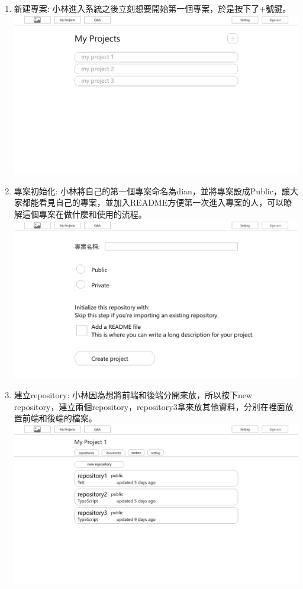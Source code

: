 \documentclass{report}
\begin{document}
\begin{enumerate}[label=(\Alph*)]
  \item 新建專案: 小林進入系統之後立刻想要開始第一個專案，於是按下了+號鍵。\\
  \includegraphics[width=\textwidth]{assets/wireframe/My_Projects.png}
  \item 專案初始化: 小林將自己的第一個專案命名為dian，並將專案設成Public，讓大家都能看見自己的專案，並加入README方便第一次進入專案的人，可以瞭解這個專案在做什麼和使用的流程。\\
  \includegraphics[width=\textwidth]{assets/wireframe/init_project.png}
  \item 建立repository: 小林因為想將前端和後端分開來放，所以按下new repository，建立兩個repository，repository3拿來放其他資料，分別在裡面放置前端和後端的檔案。\\
  \includegraphics[width=\textwidth]{assets/wireframe/My_Projects_repositories.png}

\end{enumerate}
\end{document}
